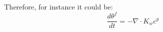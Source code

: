 Therefore, for instance it could be:
\begin{equation}
\frac{d \theta^f}{dt} = - {\nabla}\cdot  K_w c^g
\end{equation}